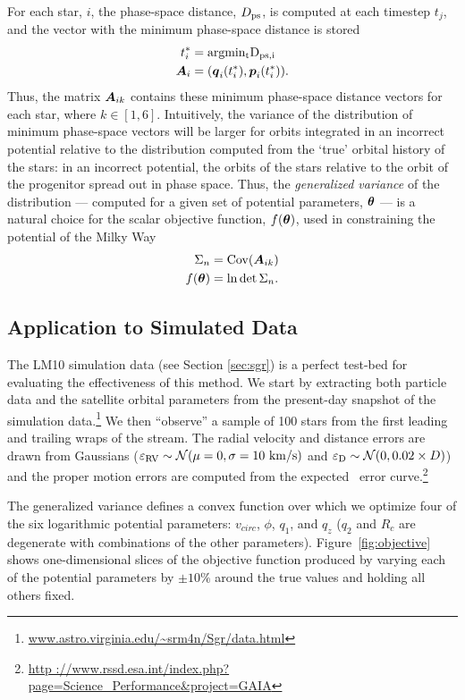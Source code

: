 For each star, $i$, the phase-space distance, $D_{\rm ps}$, is computed at each
timestep $t_{j}$, and the vector with the minimum phase-space distance is stored
\begin{align}
  t^*_{i} &= \rm argmin_{t} D_{{\rm ps},i}\\
  \boldsymbol{A}_{i} &= (\boldsymbol{q}_{i}(t^*_{i}),\boldsymbol{p}_{i}(t^*_{i})).
\end{align}
Thus, the matrix $\boldsymbol{A}_{ik}$ contains these minimum phase-space distance
vectors for each star, where $k\in[1,6]$. Intuitively, the variance of the
distribution of minimum phase-space vectors will be larger for orbits integrated
in an incorrect potential relative to the distribution computed from the `true'
orbital history of the stars: in an incorrect potential, the orbits of the stars
relative to the orbit of the progenitor spread out in phase space. Thus, the
\emph{generalized variance} of the distribution --- computed for a given set of
potential parameters, $\boldsymbol{\theta}$ --- is a natural choice for the scalar
objective function, $f(\boldsymbol{\theta})$, used in constraining the potential of the
Milky Way
\begin{align}
  \Sigma_n &= \mathrm{Cov}( \boldsymbol{A}_{ik}) \\
  f(\boldsymbol{\theta}) &= \ln \det \Sigma_n.
\end{align}

\subsection{Application to Simulated Data} \label{sec:results}
The LM10 simulation data (see Section \ref{sec:sgr}) is a perfect test-bed for
evaluating the effectiveness of this method. We start by extracting both
particle data and the satellite orbital parameters from the present-day snapshot
of the simulation
data.\footnote{\url{www.astro.virginia.edu/~srm4n/Sgr/data.html}} We then
``observe'' a sample of 100 stars from the first leading and trailing wraps of
the stream. The radial velocity and distance errors are drawn from Gaussians
($\varepsilon_{\rm RV} \sim \mathcal{N}(\mu=0,\sigma=10~{\rm km/s})$ and
$\varepsilon_{\rm D} \sim \mathcal{N}(0,0.02\times D)$) and the proper motion
errors are computed from the expected \gaia\ error curve.\footnote{\url{http
://www.rssd.esa.int/index.php?page=Science_Performance&project=GAIA}}

The generalized variance defines a convex function over which we optimize four
of the six logarithmic potential parameters: $v_{circ}$, $\phi$, $q_1$, and
$q_z$ ($q_2$ and $R_c$ are degenerate with combinations of the other
parameters). Figure~\ref{fig:objective} shows one-dimensional slices of the
objective function produced by varying each of the potential parameters by
$\pm10\%$ around the true values and holding all others fixed.

